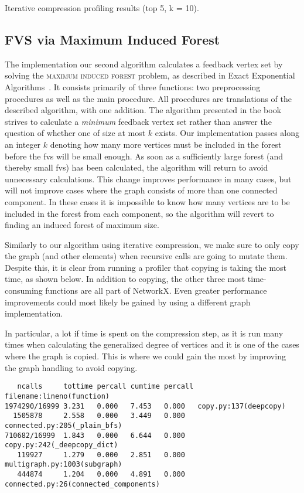 \documentclass[a4paper,12pt]{article}
\begin{document}
Iterative compression profiling results (top 5, k = 10).

\subsection{FVS via Maximum Induced Forest}

The implementation our second algorithm calculates a feedback vertex set by solving the \textsc{maximum induced forest} problem, as described in Exact Exponential Algorithms~\cite{exactexp}. It consists primarily of three functions: two preprocessing procedures as well as the main procedure. All procedures are translations of the described algorithm, with one addition. The algorithm presented in the book strives to calculate a \textit{minimum} feedback vertex set rather than answer the question of whether one of size at most $k$ exists. Our implementation passes along an integer $k$ denoting how many more vertices must be included in the forest before the fvs will be small enough. As soon as a sufficiently large forest (and thereby small fvs) has been calculated, the algorithm will return to avoid unnecessary calculations. This change improves performance in many cases, but will not improve cases where the graph consists of more than one connected component. In these cases it is impossible to know how many vertices are to be included in the forest from each component, so the algorithm will revert to finding an induced forest of maximum size.

Similarly to our algorithm using iterative compression, we make sure to only copy the graph (and other elements) when recursive calls are going to mutate them. Despite this, it is clear from running a profiler that copying is taking the most time, as shown below. In addition to copying, the other three most time-consuming functions are all part of NetworkX. Even greater performance improvements could most likely be gained by using a different graph implementation.

In particular, a lot if time is spent on the compression step, as it is run many times when calculating the generalized degree of vertices and it is one of the cases where the graph is copied. This is where we could gain the most by improving the graph handling to avoid copying.

\begin{verbatim}
   ncalls     tottime percall cumtime percall filename:lineno(function)
1974290/16999 3.231   0.000   7.453   0.000   copy.py:137(deepcopy)
  1505878     2.558   0.000   3.449   0.000   connected.py:205(_plain_bfs)
710682/16999  1.843   0.000   6.644   0.000   copy.py:242(_deepcopy_dict)
   119927     1.279   0.000   2.851   0.000   multigraph.py:1003(subgraph)
   444874     1.204   0.000   4.891   0.000   connected.py:26(connected_components)
\end{verbatim}
\end{document}
